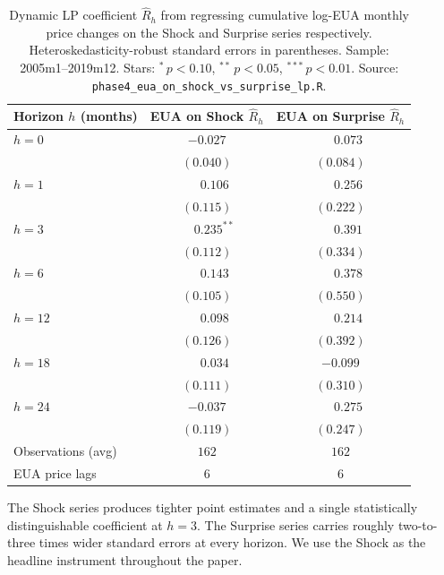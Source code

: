 \begin{table}[H]
    \centering
    \caption{Dynamic LP coefficient $\hat R_h$ from regressing cumulative log-EUA monthly price changes on the \citet{kanzig2023unequal} Shock and Surprise series respectively. Heteroskedasticity-robust standard errors in parentheses. Sample: 2005m1--2019m12. Stars: $^{*}\,p<0.10$, $^{**}\,p<0.05$, $^{***}\,p<0.01$. Source: \texttt{phase4\_eua\_on\_shock\_vs\_surprise\_lp.R}.}
    \label{tab:app_rh}
    \begin{tabular}{lcc}
        \toprule
        Horizon $h$ (months) & EUA on Shock $\hat R_h$ & EUA on Surprise $\hat R_h$ \\
        \midrule
        $h = 0$  & $-0.027$            & $\phantom{-}0.073$  \\
                 & $(0.040)$           & $(0.084)$           \\
        $h = 1$  & $\phantom{-}0.106$  & $\phantom{-}0.256$  \\
                 & $(0.115)$           & $(0.222)$           \\
        $h = 3$  & $\phantom{-}0.235^{**}$ & $\phantom{-}0.391$  \\
                 & $(0.112)$           & $(0.334)$           \\
        $h = 6$  & $\phantom{-}0.143$  & $\phantom{-}0.378$  \\
                 & $(0.105)$           & $(0.550)$           \\
        $h = 12$ & $\phantom{-}0.098$  & $\phantom{-}0.214$  \\
                 & $(0.126)$           & $(0.392)$           \\
        $h = 18$ & $\phantom{-}0.034$  & $-0.099$            \\
                 & $(0.111)$           & $(0.310)$           \\
        $h = 24$ & $-0.037$            & $\phantom{-}0.275$  \\
                 & $(0.119)$           & $(0.247)$           \\
        \midrule
        Observations (avg) & $162$               & $162$               \\
        EUA price lags     & 6                   & 6                   \\
        \bottomrule
    \end{tabular}
\end{table}

The Shock series produces tighter point estimates and a single statistically distinguishable coefficient at $h = 3$. The Surprise series carries roughly two-to-three times wider standard errors at every horizon. We use the Shock as the headline instrument throughout the paper.

